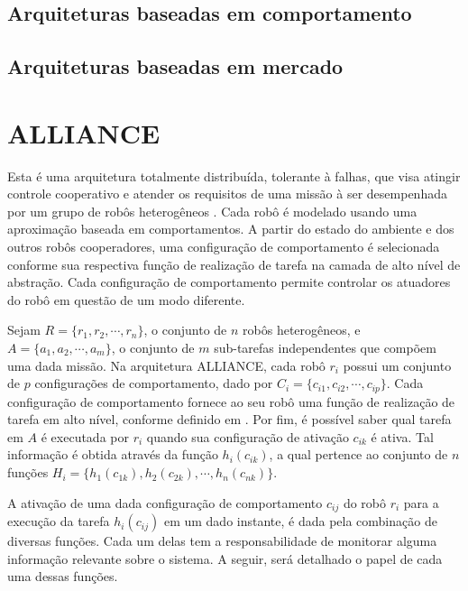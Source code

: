         \subsection{Arquiteturas baseadas em comportamento} \label{subsec:arch_comportamento}
        
        \subsection{Arquiteturas baseadas em mercado} \label{subsec:arch_mercado}
    
    \section{ALLIANCE} \label{sec:alliance}
    
        Esta é uma arquitetura totalmente distribuída, tolerante à falhas, que visa atingir controle cooperativo e atender os requisitos de uma missão à ser desempenhada por um grupo de robôs heterogêneos \cite{ref:parker1998alliance}. Cada robô é modelado usando uma aproximação baseada em comportamentos. A partir do estado do ambiente e dos outros robôs cooperadores, uma configuração de comportamento é selecionada conforme sua respectiva função de realização de tarefa na camada de alto nível de abstração. Cada configuração de comportamento permite controlar os atuadores do robô em questão de um modo diferente.
        
        Sejam $R=\{r_1, r_2, \cdots, r_n\}$, o conjunto de $n$ robôs heterogêneos, e $A=\{a_1,a_2, \cdots,\allowbreak a_m\}$, o conjunto de $m$ sub-tarefas independentes que compõem uma dada missão. Na arquitetura ALLIANCE, cada robô $r_i$ possui um conjunto de $p$ configurações de comportamento, dado por $C_i=\{c_{i1}, c_{i2},\cdots, c_{ip}\}$. Cada configuração de comportamento fornece ao seu robô uma função de realização de tarefa em alto nível, conforme definido em \cite{ref:brooks1986robust}. Por fim, é possível saber qual tarefa em $A$ é executada por $r_i$ quando sua configuração de ativação $c_{ik}$ é ativa. Tal informação é obtida através da função $h_i(c_{ik})$, a qual pertence ao conjunto de $n$ funções $H_i=\{h_1(c_{1k}),\allowbreak h_2(c_{2k}), \cdots, h_n(c_{nk})\}$.
        
        A ativação de uma dada configuração de comportamento $c_{ij}$ do robô $r_i$ para a execução da tarefa $h_i(c_{ij})$ em um dado instante, é dada pela combinação de diversas funções. Cada um delas tem a responsabilidade de monitorar alguma informação relevante sobre o sistema. A seguir, será detalhado o papel de cada uma dessas funções.
        
